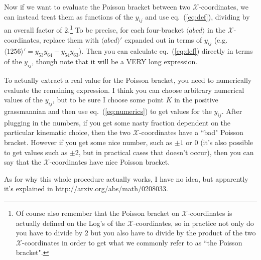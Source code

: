 \documentclass[12pt]{article}
\def\ket#1{\langle #1 \rangle}
\begin{document}
Now if we want to evaluate the Poisson bracket between two $\mathcal{X}$-coordinates, we can instead treat them as functions of the $y_{ij}$ and use eq.~(\ref{eq:def}), dividing by an overall factor of 2.\footnote{Of course also remember that the Poisson bracket on $\mathcal{X}$-coordinates is actually defined on the Log's of the $\mathcal{X}$-coordinates, so in practice not only do you have to divide by $2$ but you also have to divide by the product of the two $\mathcal{X}$-coordinates in order to get what we commonly refer to as ``the Poisson bracket".} To be precise, for each four-bracket $\ket{abcd}$ in the $\mathcal{X}$-coordinates, replace them with $\ket{abcd}'$ expanded out in terms of $y_{ij}$ (e.g. $\ket{1256}' =y_{53} y_{64}-y_{54} y_{63}$). Then you can calculate eq.~(\ref{eq:def}) directly in terms of the $y_{ij}$, though note that it will be a VERY long expression. 

To actually extract a real value for the Poisson bracket, you need to numerically evaluate the remaining expression. I think you can choose arbitrary numerical values of the $y_{ij}$, but to be sure I choose some point $K$ in the positive grassmannian and then use eq.~(\ref{eq:numerics}) to get values for the $y_{ij}$. After plugging in the numbers, if you get some nasty fraction dependent on the particular kinematic choice, then the two $\mathcal{X}$-coordinates have a ``bad" Poisson bracket. However if you get some nice number, such as $\pm1$ or 0 (it's also possible to get values such as $\pm2$, but in practical cases that doesn't occur), then you can say that the $\mathcal{X}$-coordinates have nice Poisson bracket. 

As for why this whole procedure actually works, I have no idea, but apparently it's explained in http://arxiv.org/abs/math/0208033. 
\end{document}
